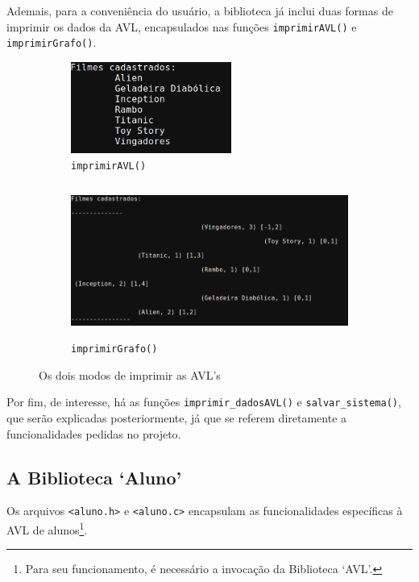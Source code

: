 \documentclass[12pt,a4paper,portuguese]{article}
\begin{document}
        Ademais, para a conveniência do usuário, a biblioteca já inclui duas formas de imprimir os dados da AVL, encapsulados nas funções \verb|imprimirAVL()| e \verb|imprimirGrafo()|.
        \begin{figure}[H]
            \centering
            \begin{subfigure}[t]{0.3\textwidth}
                \centering
                \includegraphics[height=3cm]{imgs/lista_filmes_LISTAS_3.png}
                \caption{\texttt{imprimirAVL()}}\label{fig:imprimirAVL}
            \end{subfigure}%
            \hfill
         \begin{subfigure}[t]{0.6\textwidth}
                \centering
                \includegraphics[height=5cm]{imgs/lista_filmes_ARVORE_3.png}
                \caption{\texttt{imprimirGrafo()}}\label{fig:imprimirGrafo}
            \end{subfigure}
            \caption{Os dois modos de imprimir as AVL's}
        \end{figure}

        Por fim, de interesse, há as funções \verb|imprimir_dadosAVL()| e \verb|salvar_sistema()|, que serão explicadas posteriormente, já que se referem diretamente a funcionalidades pedidas no projeto.

    \subsection{A Biblioteca `Aluno'}
        Os arquivos \verb|<aluno.h>| e \verb|<aluno.c>| encapsulam as funcionalidades específicas à AVL de alunos\footnote{Para seu funcionamento, é necessário a invocação da Biblioteca `AVL'.}.
\end{document}
